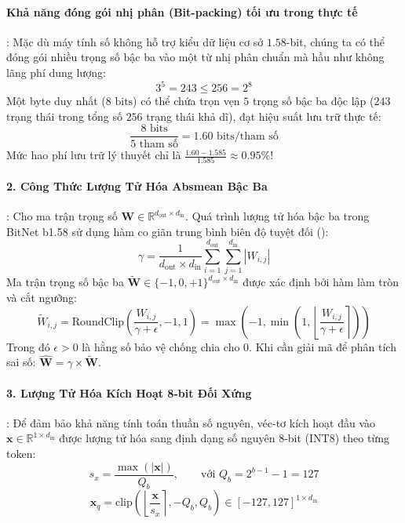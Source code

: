 \paragraph{Khả năng đóng gói nhị phân (Bit-packing) tối ưu trong thực tế}:
Mặc dù máy tính số không hỗ trợ kiểu dữ liệu cơ sở $1.58$-bit, chúng ta có thể đóng gói nhiều trọng số bậc ba vào một từ nhị phân chuẩn mà hầu như không lãng phí dung lượng:
\begin{equation}
3^5 = 243 \le 256 = 2^8
\end{equation}
Một byte duy nhất ($8\text{ bits}$) có thể chứa trọn vẹn $5$ trọng số bậc ba độc lập ($243$ trạng thái trong tổng số $256$ trạng thái khả dĩ), đạt hiệu suất lưu trữ thực tế:
\begin{equation}
\frac{8\text{ bits}}{5\text{ tham số}} = 1.60\text{ bits/tham số}
\end{equation}
Mức hao phí lưu trữ lý thuyết chỉ là $\frac{1.60 - 1.585}{1.585} \approx 0.95\%$!

\paragraph{2. Công Thức Lượng Tử Hóa Absmean Bậc Ba}:
Cho ma trận trọng số $\mathbf{W} \in \mathbb{R}^{d_{\text{out}} \times d_{\text{in}}}$. Quá trình lượng tử hóa bậc ba trong BitNet b1.58 sử dụng hàm co giãn trung bình biên độ tuyệt đối ():
\begin{equation}
\gamma = \frac{1}{d_{\text{out}} \times d_{\text{in}}} \sum_{i=1}^{d_{\text{out}}} \sum_{j=1}^{d_{\text{in}}} |W_{i,j}|
\end{equation}
Ma trận trọng số bậc ba $\widetilde{\mathbf{W}} \in \{-1, 0, +1\}^{d_{\text{out}} \times d_{\text{in}}}$ được xác định bởi hàm làm tròn và cắt ngưỡng:
\begin{equation}
\label{eq:bitnet-weight-quant}
\widetilde{W}_{i,j} = \text{RoundClip}\left( \frac{W_{i,j}}{\gamma + \epsilon}, -1, 1 \right) = \max\left(-1, \min\left(1, \left\lfloor \frac{W_{i,j}}{\gamma + \epsilon} \right\rceil\right)\right)
\end{equation}
Trong đó $\epsilon > 0$ là hằng số bảo vệ chống chia cho 0. Khi cần giải mã để phân tích sai số: $\widehat{\mathbf{W}} = \gamma \times \widetilde{\mathbf{W}}$.

\paragraph{3. Lượng Tử Hóa Kích Hoạt 8-bit Đối Xứng}:
Để đảm bảo khả năng tính toán thuần số nguyên, véc-tơ kích hoạt đầu vào $\mathbf{x} \in \mathbb{R}^{1 \times d_{\text{in}}}$ được lượng tử hóa sang định dạng số nguyên 8-bit (INT8) theo từng token:
\begin{equation}
s_x = \frac{\max(|\mathbf{x}|)}{Q_b}, \qquad \text{với } Q_b = 2^{b-1} - 1 = 127
\end{equation}
\begin{equation}
\mathbf{x}_q = \text{clip}\left( \left\lfloor \frac{\mathbf{x}}{s_x} \right\rceil, -Q_b, Q_b \right) \in [-127, 127]^{1 \times d_{\text{in}}}
\end{equation}

